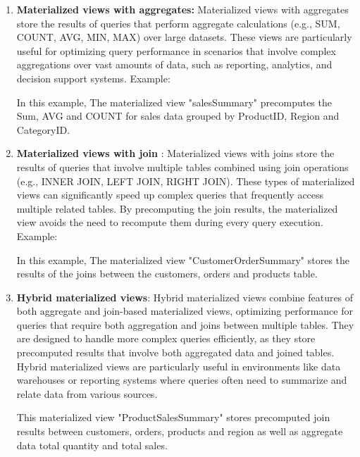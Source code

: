 \begin{enumerate}[label=\alph*)]
    \item \textbf{Materialized views with aggregates:} Materialized views with aggregates store the results of queries that perform aggregate calculations (e.g., SUM, COUNT, AVG, MIN, MAX) over large datasets. These views are particularly useful for optimizing query performance in scenarios that involve complex aggregations over vast amounts of data, such as reporting, analytics, and decision support systems. Example:
    

    In this example, The materialized view "salesSummary" precomputes the Sum, AVG and COUNT for sales data grouped by ProductID, Region and CategoryID.

    \item \textbf{Materialized views with join }: Materialized views with joins store the results of queries that involve multiple tables combined using join operations (e.g., INNER JOIN, LEFT JOIN, RIGHT JOIN). These types of materialized views can significantly speed up complex queries that frequently access multiple related tables. By precomputing the join results, the materialized view avoids the need to recompute them during every query execution. Example: 
    

    In this example, The materialized view "CustomerOrderSummary"
    stores the results of the joins between the customers, orders and products table.
    \item \textbf{Hybrid materialized views}: Hybrid materialized views combine features of both aggregate and join-based materialized views, optimizing performance for queries that require both aggregation and joins between multiple tables. They are designed to handle more complex queries efficiently, as they store precomputed results that involve both aggregated data and joined tables. Hybrid materialized views are particularly useful in environments like data warehouses or reporting systems where queries often need to summarize and relate data from various sources.
    
This materialized view "ProductSalesSummary" stores precomputed join results between customers, orders, products and region as well as aggregate data total quantity and total sales.
    
\end{enumerate}

